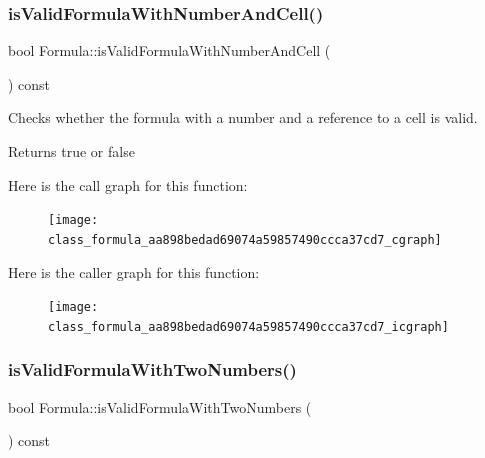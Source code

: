 \subsubsection{\texorpdfstring{is\+Valid\+Formula\+With\+Number\+And\+Cell()}{isValidFormulaWithNumberAndCell()}}
{\footnotesize\ttfamily bool Formula\+::is\+Valid\+Formula\+With\+Number\+And\+Cell (\begin{DoxyParamCaption}{ }\end{DoxyParamCaption}) const\hspace{0.3cm}{\ttfamily [private]}}

Checks whether the formula with a number and a reference to a cell is valid. \begin{DoxyReturn}{Returns}
true or false 
\end{DoxyReturn}
Here is the call graph for this function\+:\nopagebreak
\begin{figure}[H]
\begin{center}
\leavevmode
\texttt{[image: class\_formula\_aa898bedad69074a59857490ccca37cd7\_cgraph]}
\end{center}
\end{figure}
Here is the caller graph for this function\+:\nopagebreak
\begin{figure}[H]
\begin{center}
\leavevmode
\texttt{[image: class\_formula\_aa898bedad69074a59857490ccca37cd7\_icgraph]}
\end{center}
\end{figure}
\mbox{\label{class_formula_adada9416ff44be9f258b73eb1d4e1533}} 
\subsubsection{\texorpdfstring{is\+Valid\+Formula\+With\+Two\+Numbers()}{isValidFormulaWithTwoNumbers()}}
{\footnotesize\ttfamily bool Formula\+::is\+Valid\+Formula\+With\+Two\+Numbers (\begin{DoxyParamCaption}{ }\end{DoxyParamCaption}) const\hspace{0.3cm}{\ttfamily [private]}}

